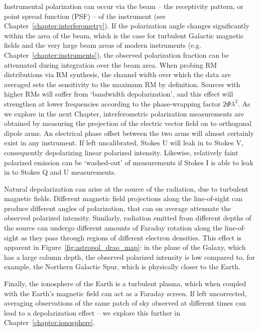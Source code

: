 Instrumental polarization can occur via the beam -- the receptivity pattern, or point spread function (PSF) -- of the instrument (see Chapter~\ref{chapter:interferometry}). If the polarization angle changes significantly within the area of the beam, which is the case for turbulent Galactic magnetic fields and the very large beam areas of modern instruments (e.g. Chapter~\ref{chapter:instruments}), the observed polarization fraction can be attenuated during integration over the beam area. 
When probing RM distributions via RM synthesis, the channel width over which the data are averaged sets the sensitivity to the maximum RM by definition. Sources with higher RMs will suffer from `bandwidth depolarization', and this effect will strengthen at lower frequencies according to the phase-wrapping factor $2\Phi\lambda^2$.
As we explore in the next Chapter, interferometric polarization measurements are obtained by measuring the projection of the electric vector field on to orthogonal dipole arms. An electrical phase offset between the two arms will almost certainly exist in any instrument. If left uncalibrated, Stokes U will leak in to Stokes V, consequently depolarizing linear polarized intensity. Likewise, relatively faint polarized emission can be `washed-out' of measurements if Stokes I is able to leak in to Stokes Q and U measurements.

Natural depolarization can arise at the source of the radiation, due to turbulent magnetic fields. Different magnetic field projections along the line-of-sight can produce different angles of polarization, that can on average attenuate the observed polarized intensity. Similarly, radiation emitted from different depths of the source can undergo different amounts of Faraday rotation along the line-of-sight as they pass through regions of different electron densities. This effect is apparent in Figure~\ref{fig:astropol_drao_map}: in the plane of the Galaxy, which has a large column depth, the observed polarized intensity is low compared to, for example, the Northern Galactic Spur, which is physically closer to the Earth. 

Finally, the ionosphere of the Earth is a turbulent plasma, which when coupled with the Earth's magnetic field can act as a Faraday screen. If left uncorrected, averaging observations of the same patch of sky observed at different times can lead to a depolarization effect -- we explore this further in Chapter~\ref{chapter:ionosphere}.

